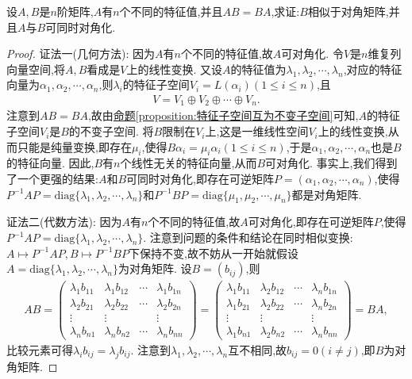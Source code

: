 \documentclass[../../main.tex]{subfiles}
\begin{document}
\begin{proposition}\label{proposition:可对角化矩阵与其他矩阵乘法可交换诱导可同时对角化}
设$A,B$是$n$阶矩阵,$A$有$n$个不同的特征值,并且$AB = BA$,求证:$B$相似于对角矩阵,并且$A$与$B$可同时对角化.
\end{proposition}
\begin{proof}
{\color{blue}证法一(几何方法):} 因为$A$有$n$个不同的特征值,故$A$可对角化. 令$V$是$n$维复列向量空间,将$A,B$看成是$V$上的线性变换. 又设$A$的特征值为$\lambda_1,\lambda_2,\cdots,\lambda_n$,对应的特征向量为$\alpha_1,\alpha_2,\cdots,\alpha_n$,则$\lambda_i$的特征子空间$V_i = L(\alpha_i)(1 \leq i \leq n)$,且
\begin{align*}
V = V_1 \oplus V_2 \oplus \cdots \oplus V_n.
\end{align*}
注意到$AB = BA$,故由\hyperref[proposition:特征子空间互为不变子空间]{命题\ref{proposition:特征子空间互为不变子空间}}可知,$A$的特征子空间$V_i$是$B$的不变子空间. 将$B$限制在$V_i$上,这是一维线性空间$V_i$上的线性变换,从而只能是纯量变换,即存在$\mu_i$,使得$B\alpha_i = \mu_i\alpha_i(1 \leq i \leq n)$,于是$\alpha_1,\alpha_2,\cdots,\alpha_n$也是$B$的特征向量. 因此,$B$有$n$个线性无关的特征向量,从而$B$可对角化. 事实上,我们得到了一个更强的结果:$A$和$B$可同时对角化,即存在可逆矩阵$P = (\alpha_1,\alpha_2,\cdots,\alpha_n)$,使得$P^{-1}AP = \mathrm{diag}\{\lambda_1,\lambda_2,\cdots,\lambda_n\}$和$P^{-1}BP = \mathrm{diag}\{\mu_1,\mu_2,\cdots,\mu_n\}$都是对角矩阵.

{\color{blue}证法二(代数方法):}
 因为$A$有$n$个不同的特征值,故$A$可对角化,即存在可逆矩阵$P$,使得$P^{-1}AP = \mathrm{diag}\{\lambda_1,\lambda_2,\cdots,\lambda_n\}$. 注意到问题的条件和结论在同时相似变换:$A \mapsto P^{-1}AP,B \mapsto P^{-1}BP$下保持不变,故不妨从一开始就假设$A = \mathrm{diag}\{\lambda_1,\lambda_2,\cdots,\lambda_n\}$为对角矩阵. 设$B = (b_{ij})$,则
\begin{align*}
AB=\begin{pmatrix}
\lambda_1b_{11}&\lambda_1b_{12}&\cdots&\lambda_1b_{1n}\\
\lambda_2b_{21}&\lambda_2b_{22}&\cdots&\lambda_2b_{2n}\\
\vdots&\vdots&&\vdots\\
\lambda_nb_{n1}&\lambda_nb_{n2}&\cdots&\lambda_nb_{nn}
\end{pmatrix}=\begin{pmatrix}
\lambda_1b_{11}&\lambda_2b_{12}&\cdots&\lambda_nb_{1n}\\
\lambda_1b_{21}&\lambda_2b_{22}&\cdots&\lambda_nb_{2n}\\
\vdots&\vdots&&\vdots\\
\lambda_1b_{n1}&\lambda_2b_{n2}&\cdots&\lambda_nb_{nn}
\end{pmatrix}=BA,
\end{align*}
比较元素可得$\lambda_ib_{ij} = \lambda_jb_{ij}$. 注意到$\lambda_1,\lambda_2,\cdots,\lambda_n$互不相同,故$b_{ij} = 0(i \neq j)$,即$B$为对角矩阵.
\end{proof}
\end{document}
